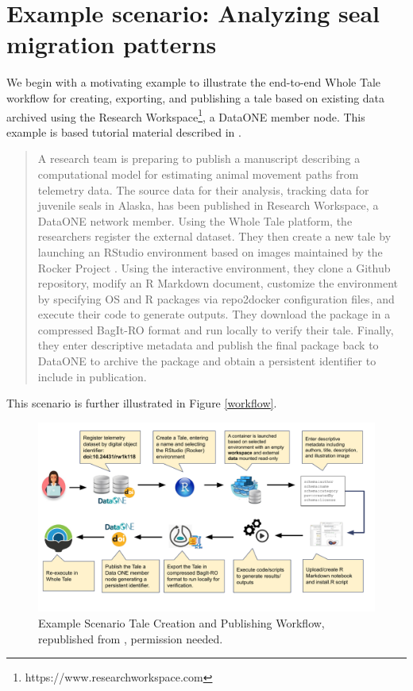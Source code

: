 \documentclass[conference]{IEEEtran}
\begin{document}
\section{Example scenario: Analyzing seal migration patterns} \label{scenario}
We begin with a motivating example to illustrate the end-to-end Whole Tale workflow for creating, exporting, and publishing a tale based on existing data archived using the Research Workspace\footnote{https://www.researchworkspace.com}, a DataONE member node. This example is based tutorial material described in \cite{london2018}.

\begin{quote}
A research team is preparing to publish a manuscript describing a computational model for 
estimating animal movement paths from telemetry data. The source data for their analysis, 
tracking data for juvenile seals in Alaska\cite{cameron2018}, has been published in Research 
Workspace, a DataONE network member. Using the Whole Tale platform, the researchers register the 
external dataset. They then create a new tale by launching an RStudio environment based on 
images maintained by the Rocker Project \cite{boettiger2018}. Using the interactive environment, 
they clone a Github repository, modify an R Markdown document, customize the environment by 
specifying OS and R packages via repo2docker configuration files, and execute their code to 
generate outputs. They download the package in a compressed BagIt-RO format and run locally to 
verify their tale. Finally, they enter descriptive metadata and publish the final 
package back to DataONE to archive the package and obtain a persistent identifier to include in publication. 
\end{quote}

This scenario is further illustrated in Figure \ref{workflow}.


\begin{figure}
\centering
\includegraphics[scale=0.6]{images/wholetale-workflow.pdf}
\caption{Example Scenario Tale Creation and Publishing Workflow, republished from \cite{chard2019}, permission needed.}
\end{figure}
\label{workflow}
\end{document}
